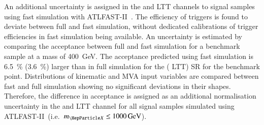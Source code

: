 An additional uncertainty is assigned in the \hadhad and \lephad LTT channels to
signal samples using fast simulation with
\textsc{ATLFAST-II}~\cite{SOFT-2010-01}. The efficiency of \tauhadvis triggers
is found to deviate between full and fast simulation, without dedicated
calibrations of \tauhadvis trigger efficiencies in fast simulation being
available. An uncertainty is estimated by comparing the acceptance between full
and fast simulation for a benchmark sample at a mass of \SI{400}{\GeV}. The
acceptance predicted using fast simulation is \SI{6.5}{\percent}
(\SI{3.6}{\percent}) larger than in full simulation for the \hadhad (\lephad
LTT) SR for the benchmark point. Distributions of kinematic and MVA input
variables are compared between fast and full simulation showing no significant
deviations in their shapes. Therefore, the difference in acceptance is assigned
as an additional normalisation uncertainty in the \hadhad and \lephad LTT
channel for all signal samples simulated using \textsc{ATLFAST-II}~(i.e.\
$\mX \leq \SI{1000}{\GeV}$).

